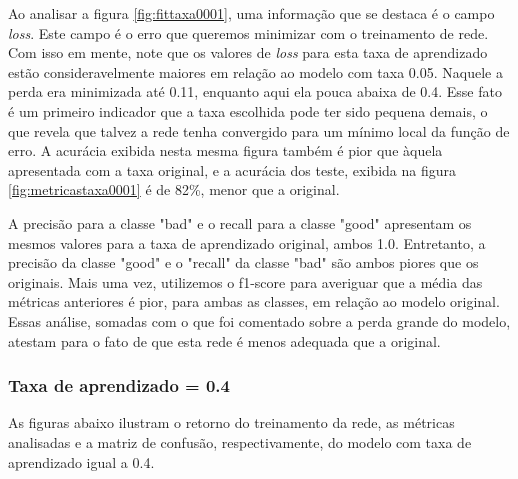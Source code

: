 \documentclass[12pt]{article}
\begin{document}
Ao analisar a figura \ref{fig:fittaxa0001}, uma informação que se destaca é o campo \textit{loss}. Este campo é o erro que queremos minimizar com o treinamento de rede. Com isso em mente, note que os valores de \textit{loss} para esta taxa de aprendizado estão consideravelmente maiores em relação ao modelo com taxa 0.05. Naquele a perda era minimizada até 0.11, enquanto aqui ela pouca abaixa de 0.4. Esse fato é um primeiro indicador que a taxa escolhida pode ter sido pequena demais, o que revela que talvez a rede tenha convergido para um mínimo local da função de erro. A acurácia exibida nesta mesma figura também é pior que àquela apresentada com a taxa original, e a acurácia dos teste, exibida na figura \ref{fig:metricastaxa0001} é de 82\%, menor que a original.

A precisão para a classe "bad" e o recall para a classe "good" apresentam os mesmos valores para a taxa de aprendizado original, ambos 1.0. Entretanto, a precisão da classe "good" e o "recall" da classe "bad" são ambos piores que os originais. Mais uma vez, utilizemos o f1-score para averiguar que a média das métricas anteriores é pior, para ambas as classes, em relação ao modelo original. Essas análise, somadas com o que foi comentado sobre a perda grande do modelo, atestam para o fato de que esta rede é menos adequada que a original. 
\subsubsection{Taxa de aprendizado = 0.4}

As figuras abaixo ilustram o retorno do treinamento da rede, as métricas analisadas e a matriz de confusão, respectivamente, do modelo com taxa de aprendizado igual a 0.4. 
\end{document}
